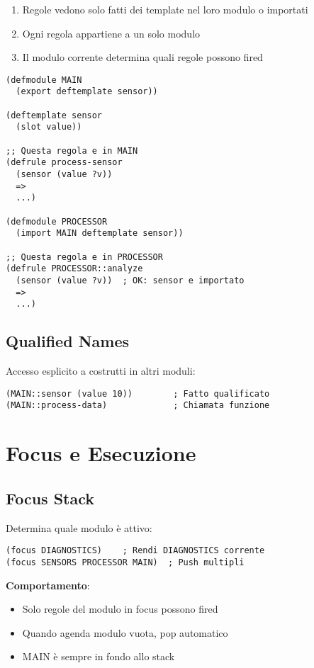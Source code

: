 \begin{enumerate}
\item Regole vedono solo fatti dei template nel loro modulo o importati
\item Ogni regola appartiene a un solo modulo
\item Il modulo corrente determina quali regole possono fired
\end{enumerate}

\begin{lstlisting}[language=CLIPS]
(defmodule MAIN
  (export deftemplate sensor))

(deftemplate sensor
  (slot value))

;; Questa regola e in MAIN
(defrule process-sensor
  (sensor (value ?v))
  =>
  ...)

(defmodule PROCESSOR
  (import MAIN deftemplate sensor))

;; Questa regola e in PROCESSOR
(defrule PROCESSOR::analyze
  (sensor (value ?v))  ; OK: sensor e importato
  =>
  ...)
\end{lstlisting}

\subsection{Qualified Names}

Accesso esplicito a costrutti in altri moduli:

\begin{lstlisting}[language=CLIPS]
(MAIN::sensor (value 10))        ; Fatto qualificato
(MAIN::process-data)             ; Chiamata funzione
\end{lstlisting}

\section{Focus e Esecuzione}

\subsection{Focus Stack}

Determina quale modulo è attivo:

\begin{lstlisting}[language=CLIPS]
(focus DIAGNOSTICS)    ; Rendi DIAGNOSTICS corrente
(focus SENSORS PROCESSOR MAIN)  ; Push multipli
\end{lstlisting}

\textbf{Comportamento}:
\begin{itemize}
\item Solo regole del modulo in focus possono fired
\item Quando agenda modulo vuota, pop automatico
\item MAIN è sempre in fondo allo stack
\end{itemize}

